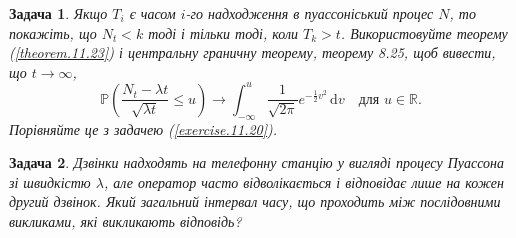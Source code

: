 \documentclass[12pt,fleqn]{article}
\newtheorem{problem}{Задача}[section]
\numberwithin{figure}{section}
\numberwithin{equation}{section}
\begin{document}
\begin{problem}
  Якщо $T_i$ є часом $i$-го надходження в пуассоніський процес $N$, то покажіть, що $N_t < k$ тоді і тільки тоді, коли $T_k > t$. Використовуйте теорему (\ref{theorem.11.23}) і центральну граничну теорему, теорему 8.25, щоб вивести, що $t \rightarrow \infty$,
  $$ \mathbb{P}(\frac{N_t-\lambda t}{\sqrt{\lambda t}}\leq u)\rightarrow \int_{-\infty}^{u}\frac{1}{\sqrt{2\pi}}e^{-\frac{1}{2}v^2}\, \mathrm{d}v \quad \text{для $u \in \mathbb{R}.$} $$
  Порівняйте це з задачею (\ref{exercise.11.20}).
\end{problem}

\begin{problem}
  Дзвінки надходять на телефонну станцію у вигляді процесу Пуассона зі швидкістю $\lambda$, але оператор часто відволікається і відповідає лише на кожен другий дзвінок. Який загальний інтервал часу, що проходить між послідовними викликами, які викликають відповідь?
\end{problem}
\end{document}
